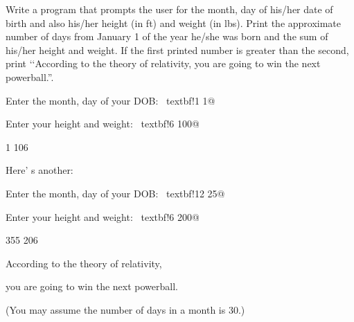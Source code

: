 Write a program that prompts the user for the month, day of his/her date of birth and also his/her height (in ft) and weight (in lbs). Print the approximate number of days from January 1 of the year he/she was born and the sum of his/her height and weight. If the first printed number is greater than the second, print \lq\lq According to the theory of relativity, you are going to win the next powerball.''.

\begin{console}[commandchars=\~\!\@]

Enter the month, day of your DOB: ~textbf!1 1@

Enter your height and weight: ~textbf!6 100@

1 106

\end{console}

Here' s another:

\begin{console}[commandchars=\~\!\@]

Enter the month, day of your DOB: ~textbf!12 25@

Enter your height and weight: ~textbf!6 200@

355 206

According to the theory of relativity,

you are going to win the next powerball.

\end{console}

(You may assume the number of days in a month is 30.)


